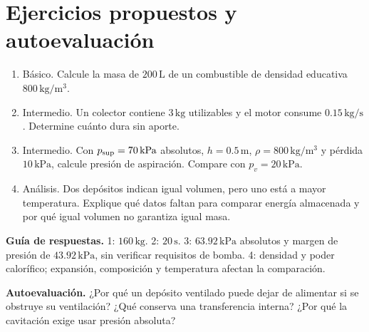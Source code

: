 \section{Ejercicios propuestos y autoevaluación}
\begin{enumerate}
\item Básico. Calcule la masa de $200\,\mathrm{L}$ de un combustible de densidad educativa $800\,\mathrm{kg/m^3}$.
\item Intermedio. Un colector contiene $3\,\mathrm{kg}$ utilizables y el motor consume $0.15\,\mathrm{kg/s}$. Determine cuánto dura sin aporte.
\item Intermedio. Con $p_{\rm sup}=70\,\mathrm{kPa}$ absolutos, $h=0.5\,\mathrm{m}$, $\rho=800\,\mathrm{kg/m^3}$ y pérdida $10\,\mathrm{kPa}$, calcule presión de aspiración. Compare con $p_v=20\,\mathrm{kPa}$.
\item Análisis. Dos depósitos indican igual volumen, pero uno está a mayor temperatura. Explique qué datos faltan para comparar energía almacenada y por qué igual volumen no garantiza igual masa.
\end{enumerate}
\textbf{Guía de respuestas.} 1: $160\,\mathrm{kg}$. 2: $20\,\mathrm{s}$. 3: $63.92\,\mathrm{kPa}$ absolutos y margen de presión de $43.92\,\mathrm{kPa}$, sin verificar requisitos de bomba. 4: densidad y poder calorífico; expansión, composición y temperatura afectan la comparación.

\textbf{Autoevaluación.} ¿Por qué un depósito ventilado puede dejar de alimentar si se obstruye su ventilación? ¿Qué conserva una transferencia interna? ¿Por qué la cavitación exige usar presión absoluta?


\studiumchaptercheck
